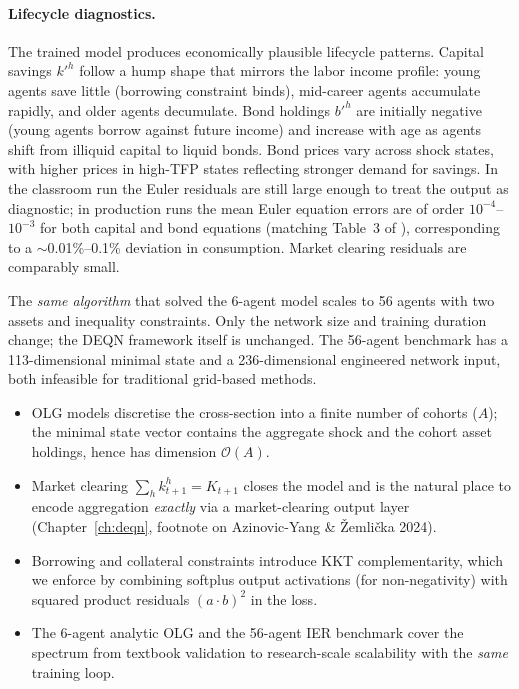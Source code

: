 \documentclass[11pt,a4paper]{report}
\begin{document}
\paragraph{Lifecycle diagnostics.}
The trained model produces economically plausible lifecycle patterns.  Capital savings $k'^h$ follow a hump shape that mirrors the labor income profile: young agents save little (borrowing constraint binds), mid-career agents accumulate rapidly, and older agents decumulate.  Bond holdings $b'^h$ are initially negative (young agents borrow against future income) and increase with age as agents shift from illiquid capital to liquid bonds.  Bond prices vary across shock states, with higher prices in high-TFP states reflecting stronger demand for savings.  In the classroom run the Euler residuals are still large enough to treat the output as diagnostic; in production runs the mean Euler equation errors are of order $10^{-4}$--$10^{-3}$ for both capital and bond equations (matching Table~3 of \citet{azinovicDEEPEQUILIBRIUMNETS2022}), corresponding to a $\sim$0.01\%--0.1\% deviation in consumption.  Market clearing residuals are comparably small.

\begin{keyinsightbox}
The \emph{same algorithm} that solved the 6-agent model scales to 56 agents with two assets and inequality constraints.  Only the network size and training duration change; the DEQN framework itself is unchanged.  The 56-agent benchmark has a 113-dimensional minimal state and a 236-dimensional engineered network input, both infeasible for traditional grid-based methods.
\end{keyinsightbox}

\begin{keyinsightbox}
\begin{itemize}[itemsep=2pt, leftmargin=*]
\item OLG models discretise the cross-section into a finite number of cohorts ($A$); the minimal state vector contains the aggregate shock and the cohort asset holdings, hence has dimension $\mathcal{O}(A)$.
\item Market clearing $\sum_h k_{t+1}^h = K_{t+1}$ closes the model and is the natural place to encode aggregation \emph{exactly} via a market-clearing output layer (Chapter~\ref{ch:deqn}, footnote on Azinovic-Yang \& \v{Z}emli\v{c}ka 2024).
\item Borrowing and collateral constraints introduce KKT complementarity, which we enforce by combining softplus output activations (for non-negativity) with squared product residuals $(a \cdot b)^2$ in the loss.
\item The 6-agent analytic OLG and the 56-agent IER benchmark cover the spectrum from textbook validation to research-scale scalability with the \emph{same} training loop.
\end{itemize}
\end{keyinsightbox}
\end{document}

